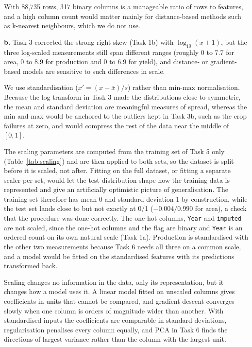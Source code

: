 \documentclass{article}
\begin{document}
With 88,735 rows, 317 binary columns is a manageable ratio of rows to features, and a high column count would matter mainly for distance-based methods such as k-nearest neighbours, which we do not use.

\textbf{b.}
Task 3 corrected the strong right-skew (Task 1b) with $\log_{10}(x+1)$, but the three log-scaled measurements still span different ranges (roughly 0 to 7.7 for area, 0 to 8.9 for production and 0 to 6.9 for yield), and distance- or gradient-based models are sensitive to such differences in scale.

We use standardisation ($x' = (x-\bar{x})/s$) rather than min-max normalisation. Because the log transform in Task 3 made the distributions close to symmetric, the mean and standard deviation are meaningful measures of spread, whereas the min and max would be anchored to the outliers kept in Task 3b, such as the crop failures at zero, and would compress the rest of the data near the middle of $[0,1]$.

The scaling parameters are computed from the training set of Task 5 only (Table~\ref{tab:scaling}) and are then applied to both sets, so the dataset is split before it is scaled, not after. Fitting on the full dataset, or fitting a separate scaler per set, would let the test distribution shape how the training data is represented and give an artificially optimistic picture of generalisation. The training set therefore has mean 0 and standard deviation 1 by construction, while the test set lands close to but not exactly at 0/1 ($-0.004/0.990$ for area), a check that the procedure was done correctly. The one-hot columns, \texttt{Year} and \texttt{imputed} are not scaled, since the one-hot columns and the flag are binary and \texttt{Year} is an ordered count on its own natural scale (Task 1a). Production is standardised with the other two measurements because Task 6 needs all three on a common scale, and a model would be fitted on the standardised features with its predictions transformed back.

Scaling changes no information in the data, only its representation, but it changes how a model uses it. A linear model fitted on unscaled columns gives coefficients in units that cannot be compared, and gradient descent converges slowly when one column is orders of magnitude wider than another. With standardised inputs the coefficients are comparable in standard deviations, regularisation penalises every column equally, and PCA in Task 6 finds the directions of largest variance rather than the column with the largest unit.
\end{document}
